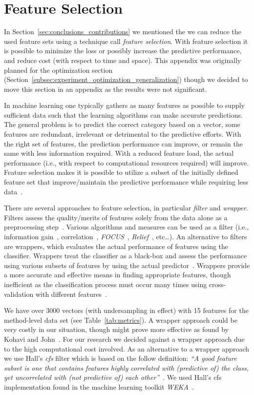 \chapter{Feature Selection}
\label{app:feature_selection}
In Section~\ref{sec:conclusions_contributions} we mentioned the we can reduce the used feature sets using a technique call \emph{feature selection}. With feature selection it is possible to minimize the loss or possibly increase the predictive performance, and reduce cost (with respect to time and space). This appendix was originally planned for the optimization section (Section~\ref{subsec:experiment_optimization_generalization}) though we decided to move this section in an appendix as the results were not significant.

In machine learning one typically gathers as many features as possible to supply sufficient data such that the learning algorithms can make accurate predictions. The general problem is to predict the correct category based on a vector, some features are redundant, irrelevant or detrimental to the predictive efforts. With the right set of features, the prediction performance can improve, or remain the same with less information required. With a reduced feature load, the actual performance (i.e., with respect to computational resources required) will improve. Feature selection makes it is possible to utilize a subset of the initially defined feature set that improve/maintain the predictive performance while requiring less data~\cite{GE03,BL97}.

There are several approaches to feature selection, in particular \emph{filter} and \emph{wrapper}. Filters assess the quality/merits of features solely from the data alone as a preprocessing step~\cite{JKP94,BL97}. Various algorithms and measures can be used as a filter (i.e., information gain~\cite{GE03}, correlation~\cite{Hal99}, \emph{FOCUS}~\cite{AD91}, \emph{Relief}~\cite{KR92}, etc\ldots). An alternative to filters are wrappers, which evaluates the actual performance of features using the classifier. Wrappers treat the classifier as a black-box and assess the performance using various subsets of features by using the actual predictor~\cite{JKP94,BL97}. Wrappers provide a more accurate and effective means in finding appropriate features, though inefficient as the classification process must occur many times using cross-validation with different features~\cite{KJ97}.

We have over 3000 vectors (with undersampling in effect) with 15 features for the method-level data set (see Table~\ref{tab:metrics}). A wrapper approach could be very costly in our situation, though might prove more effective as found by Kohavi and John~\cite{KJ97}. For our research we decided against a wrapper approach due to the high computational cost involved. As an alternative to a wrapper approach we use Hall's \emph{\gls{cfs}} filter which is based on the follow definition: \emph{``A good feature subset is one that contains features highly correlated with (predictive of) the class, yet uncorrelated with (not predictive of) each other''}~\cite{Hal99}. We used Hall's \gls{cfs} implementation found in the machine learning toolkit \emph{WEKA}~\cite{HFH+09}.

